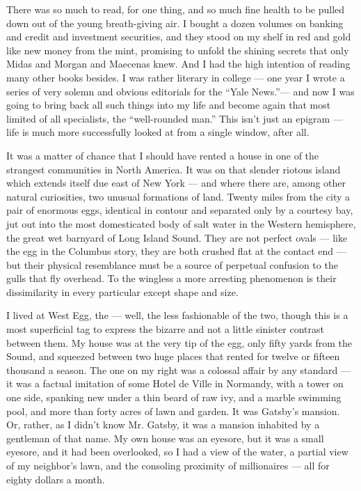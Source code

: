 \documentclass{znotebook}
\begin{document}
There was so much to read, for one thing, and so much fine health to be pulled down out of the young breath-giving air. I bought a dozen volumes on banking and credit and investment securities, and they stood on my shelf in red and gold like new money from the mint, promising to unfold the shining secrets that only Midas and Morgan and Maecenas knew. And I had the high intention of reading many other books besides. I was rather literary in college — one year I wrote a series of very solemn and obvious editorials for the ``Yale News.''— and now I was going to bring back all such things into my life and become again that most limited of all specialists, the ``well-rounded man.'' This isn’t just an epigram — life is much more successfully looked at from a single window, after all.

It was a matter of chance that I should have rented a house in one of the strangest communities in North America. It was on that slender riotous island which extends itself due east of New York — and where there are, among other natural curiosities, two unusual formations of land. Twenty miles from the city a pair of enormous eggs, identical in contour and separated only by a courtesy bay, jut out into the most domesticated body of salt water in the Western hemisphere, the great wet barnyard of Long Island Sound. They are not perfect ovals — like the egg in the Columbus story, they are both crushed flat at the contact end — but their physical resemblance must be a source of perpetual confusion to the gulls that fly overhead. To the wingless a more arresting phenomenon is their dissimilarity in every particular except shape and size.

I lived at West Egg, the — well, the less fashionable of the two, though this is a most superficial tag to express the bizarre and not a little sinister contrast between them. My house was at the very tip of the egg, only fifty yards from the Sound, and squeezed between two huge places that rented for twelve or fifteen thousand a season. The one on my right was a colossal affair by any standard — it was a factual imitation of some Hotel de Ville in Normandy, with a tower on one side, spanking new under a thin beard of raw ivy, and a marble swimming pool, and more than forty acres of lawn and garden. It was Gatsby’s mansion. Or, rather, as I didn’t know Mr. Gatsby, it was a mansion inhabited by a gentleman of that name. My own house was an eyesore, but it was a small eyesore, and it had been overlooked, so I had a view of the water, a partial view of my neighbor’s lawn, and the consoling proximity of millionaires — all for eighty dollars a month.
\end{document}

